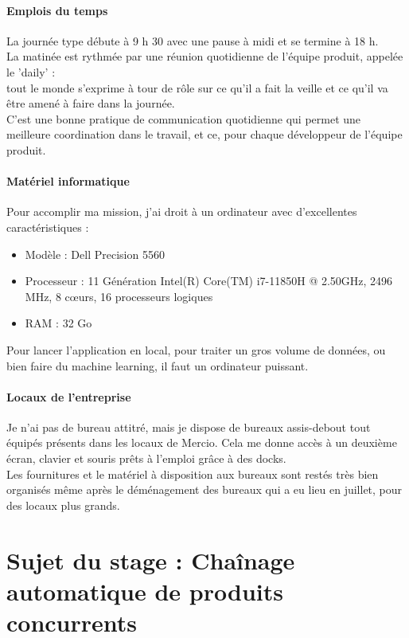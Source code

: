\documentclass{rapportCS}
\begin{document}
\paragraph{Emplois du temps}
La journée type débute à 9 h 30 avec une pause à midi et se termine à 18 h.\\
La matinée est rythmée par une réunion quotidienne de l'équipe produit, appelée le 'daily' :\\
tout le monde s'exprime à tour de rôle sur ce qu'il a fait la veille et ce qu'il va être
amené à faire dans la journée.\\
C'est une bonne pratique de communication quotidienne qui permet une meilleure coordination
dans le travail, et ce, pour chaque développeur de l'équipe produit. 

\paragraph{Matériel informatique}
Pour accomplir ma mission, j'ai droit à un ordinateur avec d'excellentes caractéristiques :
\begin{itemize}
  \item Modèle : Dell Precision 5560
  \item Processeur : 11\ieme{} Génération Intel(R) Core(TM) i7-11850H @ 2.50GHz, 2496 MHz, 8 cœurs,
   16 processeurs logiques
  \item RAM : 32 Go 
\end{itemize}
Pour lancer l'application en local, pour traiter un gros volume de données, ou bien faire du machine learning,
il faut un ordinateur puissant.

\paragraph{Locaux de l'entreprise}
Je n'ai pas de bureau attitré, mais je dispose de bureaux assis-debout tout équipés 
présents dans les locaux de Mercio.
Cela me donne accès à un deuxième écran, clavier et souris prêts à l'emploi grâce à des docks.\\
Les fournitures et le matériel à disposition aux bureaux
sont restés très bien organisés même après le déménagement des bureaux
qui a eu lieu en juillet, pour des locaux plus grands.

\newpage

\section{Sujet du stage : Chaînage automatique de produits concurrents}
\end{document}
